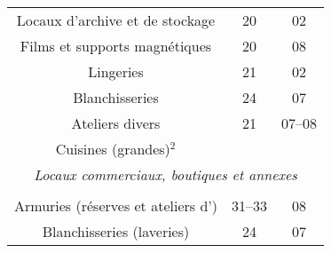 \begin{minipage}[t]{0.49\linewidth}
\begin{tabularx}{\textwidth}[t]{c X c c}
\multicolumn{2}{p{4.8cm}}{Locaux d'archive et de stockage}												&	20			&	02 \\	
\multicolumn{2}{p{4.8cm}}{Films et supports magnétiques}												&	20			&	08 \\	
\multicolumn{2}{p{4.8cm}}{Lingeries}																				&	21			&	02 \\	
\multicolumn{2}{p{4.8cm}}{Blanchisseries}																			&	24			&	07 \\	
\multicolumn{2}{p{4.8cm}}{Ateliers divers}																			&	21			&	07--08 \\	
\multicolumn{2}{p{4.8cm}}{Cuisines (grandes)$^2$}													&				& \\
\midrule
\multicolumn{4}{p{0.95\textwidth}}{\textit{Locaux commerciaux, boutiques et annexes}} \\
\middashrule \\
\multicolumn{2}{p{4.8cm}}{Armuries (réserves et ateliers d')}												&	31--33			&	08 \\	
\multicolumn{2}{p{4.8cm}}{Blanchisseries (laveries)}															&	24					&	07 \\
\end{tabularx}
\end{minipage}
\hfill
